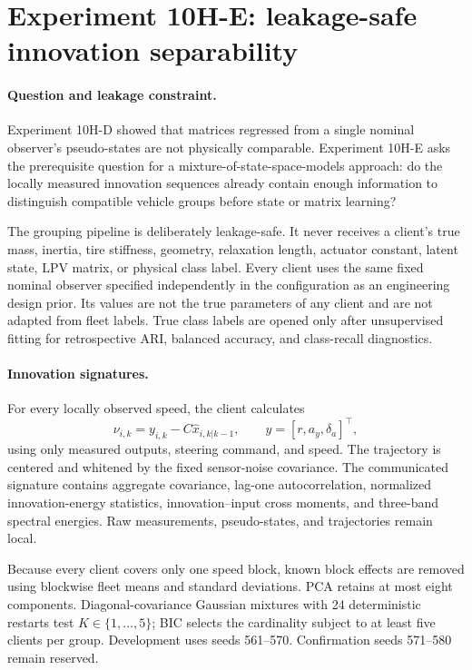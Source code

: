 \section{Experiment 10H-E: leakage-safe innovation separability}
\label{sec:experiment10he}

\paragraph{Question and leakage constraint.}
Experiment 10H-D showed that matrices regressed from a single nominal
observer's pseudo-states are not physically comparable. Experiment 10H-E asks
the prerequisite question for a mixture-of-state-space-models approach: do
the locally measured innovation sequences already contain enough information
to distinguish compatible vehicle groups before state or matrix learning?

The grouping pipeline is deliberately leakage-safe. It never receives a
client's true mass, inertia, tire stiffness, geometry, relaxation length,
actuator constant, latent state, LPV matrix, or physical class label. Every
client uses the same fixed nominal observer specified independently in the
configuration as an engineering design prior. Its values are not the true
parameters of any client and are not adapted from fleet labels. True class
labels are opened only after unsupervised fitting for retrospective ARI,
balanced accuracy, and class-recall diagnostics.

\paragraph{Innovation signatures.}
For every locally observed speed, the client calculates
\begin{equation}
 \nu_{i,k}=y_{i,k}-C\hat x_{i,k|k-1},
 \qquad y=[r,a_y,\delta_a]^\top,
\end{equation}
using only measured outputs, steering command, and speed. The trajectory is
centered and whitened by the fixed sensor-noise covariance. The communicated
signature contains aggregate covariance, lag-one autocorrelation, normalized
innovation-energy statistics, innovation--input cross moments, and three-band
spectral energies. Raw measurements, pseudo-states, and trajectories remain
local.

Because every client covers only one speed block, known block effects are
removed using blockwise fleet means and standard deviations. PCA retains at
most eight components. Diagonal-covariance Gaussian mixtures with 24
deterministic restarts test $K\in\{1,\ldots,5\}$; BIC selects the cardinality
subject to at least five clients per group. Development uses seeds 561--570.
Confirmation seeds 571--580 remain reserved.

